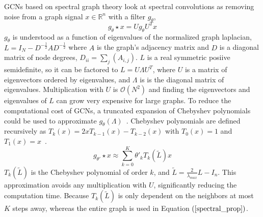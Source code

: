 \documentclass{article}
\begin{document}
GCNs based on spectral graph theory look at spectral convolutions as removing noise from a graph signal $x \in \mathbb{R}^n$ with a filter $g_\theta$,
\setcounter{equation}{0}
\begin{equation}
\label{spectral_prop}
g_\theta \star x = Ug_\theta U^Tx
\end{equation}
$g_\theta$ is understood as a function of eigenvalues of the normalized graph laplacian, $L = I_N - D^{-\frac{1}{2}}AD^{-\frac{1}{2}}$ where $A$ is the graph's adjacency matrix and $D$ is a diagonal matrix of node degrees, $D_{ii} = \sum_{j} (A_{i,j})$. $L$ is a real symmetric posiive semidefinite, so it can be factored to $L = U\Lambda U^T$, where $U$ is a matrix of eigenvectors ordered by eigenvalues, and $\Lambda$ is is the diagonal matrix of eigenvalues.  Multiplication with $U$ is $\mathcal{O}(N^2) $ and finding the eigenvectors and eigenvalues of $L$ can grow very expensive for large graphs. To reduce the computational cost of GCNs, a truncated expansion of Chebyshev polynomials could be used to approximate $g_\theta (\Lambda)$~\cite{Defferrard2016}.
Chebyshev polynomials are defined recursively as $T_k(x) = 2xT_{k-1}(x) - T_{k-2}(x)$ with $T_0(x) = 1$ and $T_1(x) = x$~\cite{Hammond2011}.
\begin{equation}
\label{cheby_prop}
g_{\theta'} \star x \approx \sum\limits_{k=0}^{K} \theta'_k T_k (\tilde{L})x
\end{equation}
$T_k(\tilde{L})$ is the Chebyshev polynomial of order $k$, and $\tilde{L} = \frac{2}{\lambda_{max}} L - I_n$. This approximation avoids any multiplication with $U$, significantly reducing the computation time. Because $T_k(\tilde{L})$ is only dependent on the neighbors at most $K$ steps away, whereas the entire graph is used in Equation $(\ref{spectral_prop})$.
\end{document}
